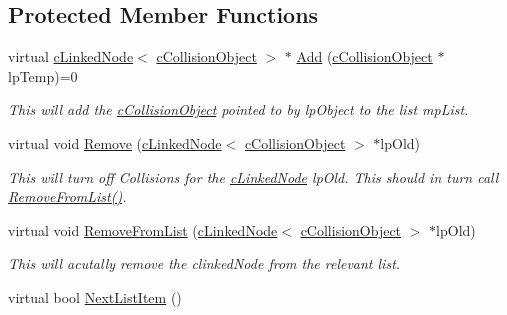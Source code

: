 \subsection*{Protected Member Functions}
\begin{DoxyCompactItemize}
\item 
\hypertarget{classc_collision_handler_ae966359105ed5e144f62e36dd85d1f03}{
virtual \hyperlink{classc_linked_node}{cLinkedNode}$<$ \hyperlink{classc_collision_object}{cCollisionObject} $>$ $\ast$ \hyperlink{classc_collision_handler_ae966359105ed5e144f62e36dd85d1f03}{Add} (\hyperlink{classc_collision_object}{cCollisionObject} $\ast$lpTemp)=0}
\label{classc_collision_handler_ae966359105ed5e144f62e36dd85d1f03}

\begin{DoxyCompactList}\small\item\em This will add the \hyperlink{classc_collision_object}{cCollisionObject} pointed to by lpObject to the list mpList. \end{DoxyCompactList}\item 
\hypertarget{classc_collision_handler_aec2e30bb6be227d30daef0b6eb36d3b3}{
virtual void \hyperlink{classc_collision_handler_aec2e30bb6be227d30daef0b6eb36d3b3}{Remove} (\hyperlink{classc_linked_node}{cLinkedNode}$<$ \hyperlink{classc_collision_object}{cCollisionObject} $>$ $\ast$lpOld)}
\label{classc_collision_handler_aec2e30bb6be227d30daef0b6eb36d3b3}

\begin{DoxyCompactList}\small\item\em This will turn off Collisions for the \hyperlink{classc_linked_node}{cLinkedNode} lpOld. This should in turn call \hyperlink{classc_collision_handler_ad2d0933b78c692a5d2b3885242fa0911}{RemoveFromList()}. \end{DoxyCompactList}\item 
\hypertarget{classc_collision_handler_ad2d0933b78c692a5d2b3885242fa0911}{
virtual void \hyperlink{classc_collision_handler_ad2d0933b78c692a5d2b3885242fa0911}{RemoveFromList} (\hyperlink{classc_linked_node}{cLinkedNode}$<$ \hyperlink{classc_collision_object}{cCollisionObject} $>$ $\ast$lpOld)}
\label{classc_collision_handler_ad2d0933b78c692a5d2b3885242fa0911}

\begin{DoxyCompactList}\small\item\em This will acutally remove the clinkedNode from the relevant list. \end{DoxyCompactList}\item 
\hypertarget{classc_collision_handler_a906305fe520cefc195f3948458aba941}{
virtual bool \hyperlink{classc_collision_handler_a906305fe520cefc195f3948458aba941}{NextListItem} ()}
\label{classc_collision_handler_a906305fe520cefc195f3948458aba941}


\end{DoxyCompactItemize}
